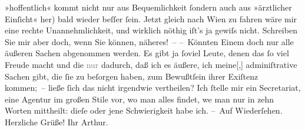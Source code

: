 \begin{ledgroupsized}[t]{13cm}
               »hoffentlich« kommt nicht nur aus Bequemlichkeit ſondern auch aus »ärztlicher
               Einſicht« her) bald {\pb}wieder beſſer ſein. Jetzt gleich nach
                  Wien zu fahren wäre mir eine rechte
               Unannehmlichkeit, und wirklich nöthig iſt’s ja gewiſs nicht. Schreiben Sie mir aber
               doch, wenn Sie können, näheres! –\pend
           \pstart
           – Könnten Einem doch nur alle äußeren Sachen abgenommen werden. Es gibt ja ſoviel
               Leute, denen das ſo viel Freude macht und die \textcolor{gray}{nur} dadurch, daß ich
               es äußere, ich {\pb}meine{[},{]} adminiſtrative
               Sachen gibt, die ſie zu beſorgen haben, zum Bewußtſein ihrer Exiſtenz kommen; – ließe
               ſich das nicht irgendwie vertheilen? Ich ſtelle mir ein Secretariat, eine Agentur im
               großen Stile vor, wo man alles findet, we{\geminationn} man nur in
               zehn Worten mittheilt: dieſe oder jene Schwierigkeit habe ich.\pend
           \pstart – Auf Wiederſehen. Herzliche Grüße! Ihr \spacefill\mbox{Arthur.}\pend{}
         
         \endnumbering{}\end{ledgroupsized}  \newcommand{\dateiname}{L00698}\newcommand{\titel}{Arthur Schnitzler an Hugo von Hofmannsthal, 9. 7. 1897}\newcommand{\editorInnen}{Martin Anton Müller und Gerd-Hermann Susen}
      